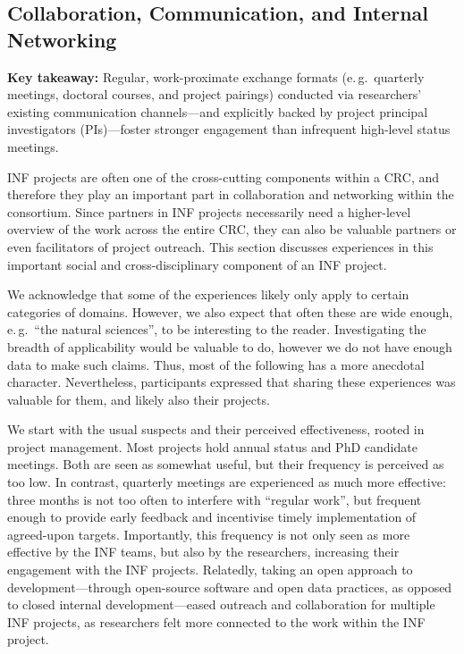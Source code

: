 \documentclass{eceasst}
\newcommand{\eg}{e.\,g.}
\begin{document}
\subsection{Collaboration, Communication, and Internal Networking}
\noindent\textbf{Key takeaway:} Regular, work-proximate exchange formats (\eg~quarterly meetings, doctoral courses, and project pairings) conducted via researchers' existing communication channels---and explicitly backed by project principal investigators (PIs)---foster stronger engagement than infrequent high-level status meetings.

\medskip
\noindent INF projects are often one of the cross-cutting components within a CRC,
and therefore they play an important part in collaboration and networking within the consortium.
Since partners in INF projects necessarily need a higher-level overview of the work across the entire CRC, 
they can also be valuable partners or even facilitators of project outreach. 
This section discusses experiences in this important social and cross-disciplinary component of an INF project.

We acknowledge that some of the experiences likely only apply to certain categories of domains.
However, we also expect that often these are wide enough, \eg~“the natural sciences”, to be interesting to the reader.
Investigating the breadth of applicability would be valuable to do, however we do not have enough data to make such claims. 
Thus, most of the following has a more anecdotal character. Nevertheless, participants expressed that sharing these experiences 
was valuable for them, and likely also their projects. 

We start with the usual suspects and their perceived effectiveness, rooted in project management.
Most projects hold annual status and PhD candidate meetings.
Both are seen as somewhat useful, but their frequency is perceived as too low.
In contrast, quarterly meetings are experienced as much more effective: 
three months is not too often to interfere with “regular work”, 
but frequent enough to provide early feedback and incentivise timely implementation of agreed-upon targets.
Importantly, this frequency is not only seen as more effective by the INF teams,
but also by the researchers, increasing their engagement with the INF projects.
Relatedly, taking an open approach to development---through open-source software and open data practices, as opposed to closed internal development---eased outreach and collaboration for multiple INF projects,
as researchers felt more connected to the work within the INF project.
\end{document}
